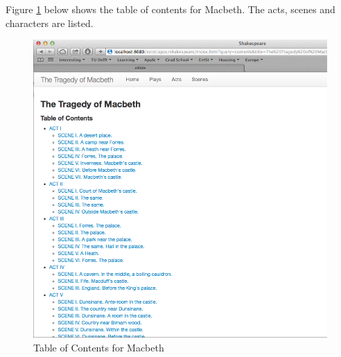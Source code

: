 \documentclass[Shakespeare.tex]{subfiles}
\begin{document}
Figure \ref{fig:macbethtoc} below shows the table of contents for Macbeth. The acts, scenes and characters are listed.
\begin{figure} [H]
	\centering
	\includegraphics[width=1\textwidth]{./Figures/MacbethTOC.png}
	\caption{Table of Contents for Macbeth}
	\label{fig:macbethtoc}
\end{figure}
\end{document}
